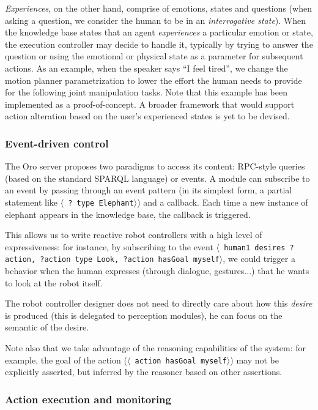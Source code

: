 \documentclass[preprint,3p,times]{elsarticle}
\newcommand{\stmt}[1]{{\footnotesize \tt $\langle$ #1\relax$\rangle$}}
\begin{document}
\emph{Experiences}, on the other hand, comprise of emotions, states and
questions (when asking a question, we consider the human to be in an
\emph{interrogative state}). When the knowledge base states that an agent
\emph{experiences} a particular emotion or state, the execution controller may
decide to handle it, typically by trying to answer the question or using the
emotional or physical state as a parameter for subsequent actions. As an
example, when the speaker says ``I feel tired'', we change the motion planner
parametrization to lower the effort the human needs to provide for the
following joint manipulation tasks. Note that this example has been implemented
as a proof-of-concept. A broader framework that would support action alteration
based on the user's experienced states is yet to be devised.

\subsubsection{Event-driven control}

The {\sc Oro} server proposes two paradigms to access its content: RPC-style
queries (based on the standard SPARQL language) or events. A module can
subscribe to an event by passing through an event pattern (in its simplest
form, a partial statement like \stmt{? type Elephant}) and a callback.  Each
time a new instance of elephant appears in the knowledge base, the callback is
triggered.

This allows us to write reactive robot controllers with a high level of
expressiveness: for instance, by subscribing to the event \stmt{human1 desires
?action, ?action type Look, ?action hasGoal myself}, we could trigger a
behavior when the human expresses (through dialogue, gestures...) that he
wants to look at the robot itself.

The robot controller designer does not need to directly care about how this
\emph{desire} is produced (this is delegated to perception modules), he can
focus on the semantic of the desire.

Note also that we take advantage of the reasoning capabilities of the system:
for example, the goal of the action (\stmt{action hasGoal myself}) may not be
explicitly asserted, but inferred by the reasoner based on other assertions.

\subsubsection{Action execution and monitoring}\label{sec:action}
\end{document}
